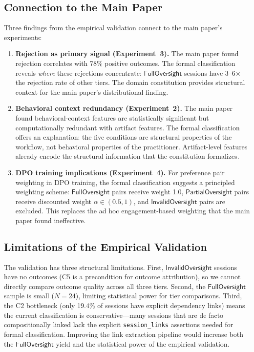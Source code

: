\documentclass[11pt]{article}
\begin{document}
\subsection{Connection to the Main Paper}
\label{sec:connection}

Three findings from the empirical validation connect to the main paper's experiments:

\begin{enumerate}[nosep]

\item \textbf{Rejection as primary signal (Experiment~3).}
The main paper found rejection correlates with 78\% positive outcomes.
The formal classification reveals \emph{where} these rejections concentrate: $\mathsf{FullOversight}$ sessions have 3--6$\times$ the rejection rate of other tiers.
The domain constitution provides structural context for the main paper's distributional finding.

\item \textbf{Behavioral context redundancy (Experiment~2).}
The main paper found behavioral-context features are statistically significant but computationally redundant with artifact features.
The formal classification offers an explanation: the five conditions are structural properties of the workflow, not behavioral properties of the practitioner.
Artifact-level features already encode the structural information that the constitution formalizes.

\item \textbf{DPO training implications (Experiment~4).}
For preference pair weighting in DPO training, the formal classification suggests a principled weighting scheme: $\mathsf{FullOversight}$ pairs receive weight 1.0, $\mathsf{PartialOversight}$ pairs receive discounted weight $\alpha \in (0.5, 1)$, and $\mathsf{InvalidOversight}$ pairs are excluded.
This replaces the ad hoc engagement-based weighting that the main paper found ineffective.

\end{enumerate}

\subsection{Limitations of the Empirical Validation}
\label{sec:empirical-limitations}

The validation has three structural limitations.
First, $\mathsf{InvalidOversight}$ sessions have no outcomes (C5 is a precondition for outcome attribution), so we cannot directly compare outcome quality across all three tiers.
Second, the $\mathsf{FullOversight}$ sample is small ($N = 24$), limiting statistical power for tier comparisons.
Third, the C2 bottleneck (only 19.4\% of sessions have explicit dependency links) means the current classification is conservative---many sessions that are de facto compositionally linked lack the explicit \texttt{session\_links} assertions needed for formal classification.
Improving the link extraction pipeline would increase both the $\mathsf{FullOversight}$ yield and the statistical power of the empirical validation.
\end{document}
